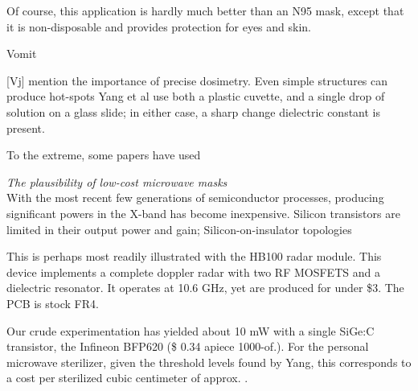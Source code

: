 \documentclass[fleqn,10pt]{article}
\begin{document}
Of course, this application is hardly much better than an N95 mask, except that it is non-disposable and provides protection for eyes and skin.

Vomit


[Vj] mention the importance of precise dosimetry. Even simple structures can produce hot-spots 
Yang et al use both a plastic cuvette, and a single drop of solution on a glass slide; in either case, a sharp change dielectric constant is present.

To the extreme, some papers have used























\clearpage
{\Large \it The plausibility of low-cost microwave masks}\\

With the most recent few generations of semiconductor processes, producing significant powers in the X-band has become inexpensive. Silicon transistors are limited in their output power and gain; Silicon-on-insulator topologies 

This is perhaps most readily illustrated with the HB100 radar module. This device implements a complete doppler radar with two RF MOSFETS and a dielectric resonator. It operates at 10.6 GHz, yet are produced for under \$3. The PCB is stock FR4.

Our crude experimentation has yielded about 10 mW with a single SiGe:C transistor, the Infineon BFP620 (\$ 0.34 apiece \@ 1000-of.). For the personal microwave sterilizer, given the threshold levels found by Yang, this corresponds to a cost per sterilized cubic centimeter of approx. \cite{BFP620H7764XTSA1}.
\end{document}
